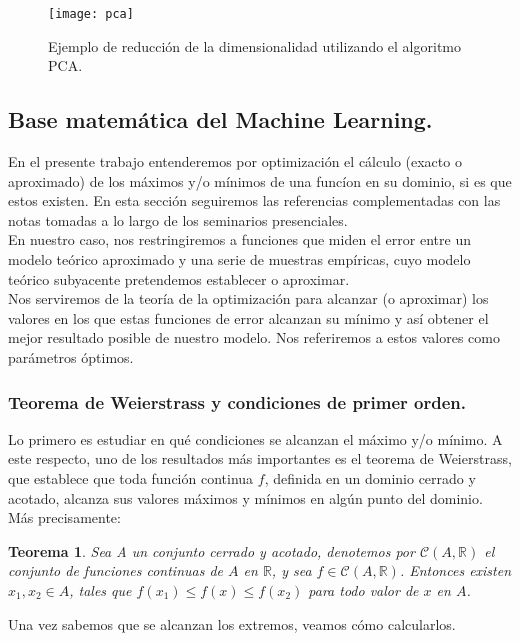 \documentclass[a4paper,11pt]{article}
\newtheorem{theorem}{Teorema}
\begin{document}
\begin{figure}[H]
\centering
\texttt{[image: pca]}
\caption{Ejemplo de reducción de la dimensionalidad utilizando el algoritmo PCA.}
\end{figure}

\subsection{ Base matemática del Machine Learning.}
\label{}

En el presente trabajo entenderemos por optimización el cálculo (exacto o
aproximado) de los máximos y/o mínimos de una funcíon en su dominio, si es
que estos existen. En esta sección seguiremos las referencias \cite{cálculo} \cite{cálculo2} complementadas con las notas tomadas a lo largo de los seminarios presenciales.\\

\noindent
En nuestro caso, nos restringiremos a funciones que miden el error entre
un modelo teórico aproximado y una serie de muestras empíricas, cuyo modelo
teórico subyacente pretendemos establecer o aproximar.\\

\noindent
Nos serviremos de la teoría de la optimización para alcanzar (o aproximar) los valores en los que estas funciones de error alcanzan su mínimo y así obtener el mejor resultado posible de nuestro modelo. Nos referiremos a estos valores como parámetros óptimos.
\subsubsection{Teorema
de Weierstrass y condiciones de primer orden.}
Lo primero es estudiar en qué condiciones se alcanzan el máximo y/o mínimo.
A este respecto, uno de los resultados más importantes es el teorema de Weierstrass, que establece que toda función continua $f$, definida en un dominio cerrado
y acotado, alcanza sus valores máximos y mínimos en algún punto del dominio.
Más precisamente:
\begin{theorem}
Sea A un conjunto cerrado y acotado, denotemos por $\mathcal{C}(A,\mathbb{R})$  el conjunto de funciones continuas de $A$ en $\mathbb{R}$, y sea $f\in\mathcal{C}(A,\mathbb{R})$. Entonces existen $ x_{1},x_{2} \in A$, tales que $ f(x_{1}) \leq f(x) \leq f(x_{2})$ para todo valor de $x$ en $A$.
\end{theorem}
\noindent
Una vez sabemos que se alcanzan los extremos, veamos cómo calcularlos.
\\
\end{document}
